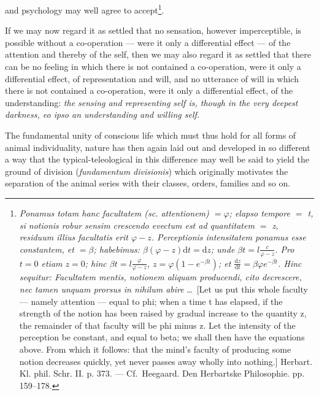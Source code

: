 \documentclass[12pt,a4paper]{book}
\begin{document}
and psychology may well agree to accept\footnote{\textit{Ponamus totam hanc facultatem
(sc. attentionem) $=\varphi$; elapso tempore $=$ t, si notionis robur sensim crescendo
evectum est ad quantitatem $=$ z, residuum illius facultatis erit $\varphi - z$.
Perceptionis intensitatem ponamus esse constantem, et $=\beta$; habebimus:
$\beta(\varphi-z)\mathrm{d}t = \mathrm{d}z$; unde $\beta t = l\frac{c}{\varphi-z}$.
Pro $t = 0$ etiam $z = 0$; hinc $\beta t = l\frac{\varphi}{\varphi-z}$, $z =
\varphi\left(1-e^{-\beta t}\right)$; et $\frac{\mathrm{d}z}{\mathrm{d}t} =
\beta\varphi e^{-\beta t}$. Hinc sequitur: Facultatem mentis, notionem aliquam
producendi, cito decrescere, nec tamen unquam prorsus in nihilum abire} \dots\
[Let us put this whole faculty --- namely attention --- equal to phi; when a time t
has elapsed, if the strength of the notion has been raised by gradual increase to the
quantity z, the remainder of that faculty will be phi minus z. Let the intensity of
the perception be constant, and equal to beta; we shall then have the equations
above. From which it follows: that the mind's faculty of producing some notion
decreases quickly, yet never passes away wholly into nothing.] Herbart. Kl. phil. Schr. II. p. 373. ---
Cf.\ Heegaard. Den Herbartske Philosophie. pp. 159--178.}.

\setcounter{footnote}{0}
If we may now regard it as settled that no sensation, however imperceptible, is
possible without a co-operation --- were it only a differential effect --- of the
attention and thereby of the self, then we may also regard it as settled that there
can be no feeling in which there is not contained a co-operation, were it only a
differential effect, of representation and will, and no utterance of will in which
there is not contained a co-operation, were it only a differential effect, of the
understanding: \emph{the sensing and representing self is, though in the very deepest
darkness, \textit{eo ipso} an understanding and willing self.}

The fundamental unity of conscious life which must thus hold for all forms of animal
individuality, nature has then again laid out and developed in so different a way
that the typical-teleological in this difference may well be said to yield the ground
of division (\textit{fundamentum divisionis}) which originally motivates the
separation of the animal series with their classes, orders, families and so on.
\end{document}
